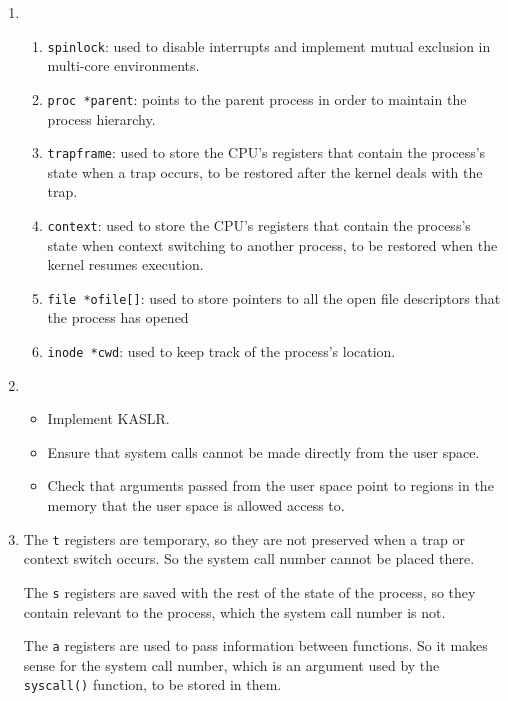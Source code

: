 \documentclass{hw}
\begin{document}
\begin{enumerate}[itemsep=.4cm]
\item   %
    \begin{enumerate}[label=\alph*.]
    \item \texttt{spinlock}: used to disable interrupts and implement mutual exclusion in multi-core environments.
    \item \texttt{proc *parent}: points to the parent process in order to maintain the process hierarchy.
    \item \texttt{trapframe}: used to store the CPU's registers that contain the process's state when a trap occurs, to be restored after the kernel deals with the trap.
    \item \texttt{context}: used to store the CPU's registers that contain the process's state when context switching to another process, to be restored when the kernel resumes execution.
    \item \texttt{file *ofile[]}: used to store pointers to all the open file descriptors that the process has opened
    \item \texttt{inode *cwd}: used to keep track of the process's location.
    \end{enumerate}
    
\item   %
    \begin{itemize}
    \item Implement KASLR.
    \item Ensure that system calls cannot be made directly from the user space.
    \item Check that arguments passed from the user space point to regions in the memory that the user space is allowed access to.
    \end{itemize}

\item The \texttt{t} registers are temporary, so they are not preserved when a trap or context switch occurs. So the system call number cannot be placed there. 

The \texttt{s} registers are saved with the rest of the state of the process, so they contain relevant to the process, which the system call number is not.

The \texttt{a} registers are used to pass information between functions. So it makes sense for the system call number, which is an argument used by the \texttt{syscall()} function, to be stored in them.


\end{enumerate}
\end{document}
